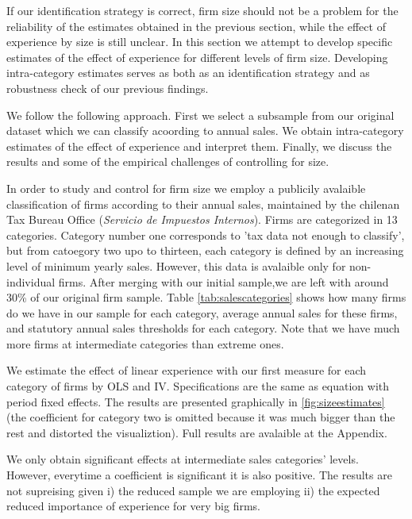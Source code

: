 If our identification strategy is correct, firm size should not be a problem for the reliability of the estimates obtained in the previous section, while the effect of experience by size is still unclear. In this section we attempt to develop specific estimates of the effect of experience for different levels of firm size. Developing intra-category estimates serves as both as an identification strategy and as  robustness check of our previous findings.

 We follow the following approach. First we select a subsample from our original dataset which we can classify acoording to annual sales.  We obtain intra-category estimates of the effect of experience and interpret them. Finally, we discuss the results and some of the empirical challenges of controlling for size.

In order to study and control for firm size we employ a publicily avalaible classification of firms according to their annual sales, maintained by the chilenan Tax Bureau Office (\textit{Servicio de Impuestos Internos}). Firms are categorized in 13 categories. Category number one  corresponds to 'tax data not enough to classify', but from catoegory two upo to thirteen, each category is defined by an increasing level of minimum yearly sales.  However, this data is avalaible only for non-individual firms. After merging with our initial sample,we are left with around 30\% of our original firm sample. Table \ref{tab:salescategories} shows how many firms do we have in our sample for each category, average annual sales for these firms, and statutory annual sales thresholds for each category. Note that we have much more firms at intermediate categories than extreme ones.



We estimate the effect of linear experience with our first measure for each category of firms by OLS and IV. Specifications are the same as equation with period fixed effects. The results are presented graphically in \ref{fig:sizeestimates} (the coefficient for category two is omitted because it was much bigger than the rest and distorted the visualiztion). Full results are avalaible at the Appendix.

We only obtain significant effects at intermediate sales categories' levels. However, everytime a coefficient is significant it is also positive. The results are not supreising given i) the reduced sample we are employing ii) the expected reduced importance of experience for very big firms.

